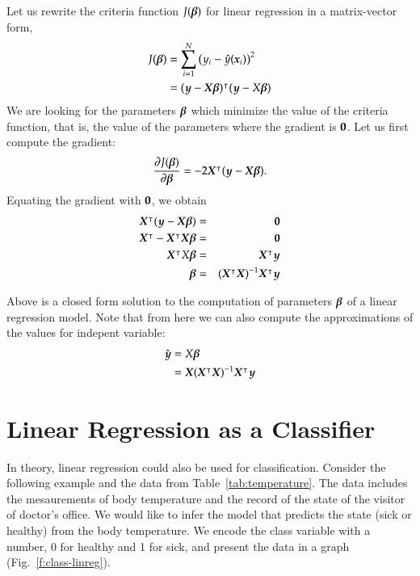 \begin{refsection}
Let us rewrite the criteria function $J(\boldsymbol{\beta})$ for linear regression in a matrix-vector form,
\begin{align}
J(\boldsymbol{\beta}) & = \sum_{i=1}^N\left(y_i-\hat{y}(\boldsymbol{x}_i)\right)^2 \\
& = (\boldsymbol{y}-\boldsymbol{X}\boldsymbol{\beta})^\intercal (\boldsymbol{y}-X\boldsymbol{\beta})
\end{align}
We are looking for the parameters $\boldsymbol{\beta}$ which minimize the value of the criteria function, that is, the value of the parameters where the gradient is $\boldsymbol{0}$. Let us first compute the gradient:
\begin{equation}
{\partial J(\boldsymbol{\beta}) \over\partial\boldsymbol{\beta}} = -2 \boldsymbol{X}^\intercal(\boldsymbol{y}-\boldsymbol{X}\boldsymbol{\beta}).
\end{equation}
Equating the gradient with $\boldsymbol{0}$, we obtain
\begin{eqnarray}
\boldsymbol{X}^\intercal(\boldsymbol{y}-\boldsymbol{X}\boldsymbol{\beta}) & = & \boldsymbol{0} \\
\boldsymbol{X}^\intercal-\boldsymbol{X}^\intercal\boldsymbol{X}\boldsymbol{\beta} & = & \boldsymbol{0} \\
\boldsymbol{X}^\intercal X\boldsymbol{\beta} & = & \boldsymbol{X}^\intercal \boldsymbol{y} \\
\boldsymbol{\beta} & = & (\boldsymbol{X}^\intercal \boldsymbol{X})^{-1}\boldsymbol{X}^\intercal \boldsymbol{y}
\end{eqnarray}

Above is a closed form solution to the computation of parameters $\boldsymbol{\beta}$ of a linear regression model. Note that from here we can also compute the approximations of the values for  indepent variable:
\begin{align}
\hat{\boldsymbol{y}} & = X\boldsymbol{\beta} \\
& = \boldsymbol{X} (\boldsymbol{X}^\intercal \boldsymbol{X})^{-1}\boldsymbol{X}^\intercal \boldsymbol{y}
\end{align}

\section{Linear Regression as a Classifier}

In theory, linear regression could also be used for classification. Consider the following example and the data from Table~\ref{tab:temperature}. The data includes the mesaurements of body temperature and the record of the state of the visitor of doctor's office. We would like to infer the model that predicts the state (sick or healthy) from the body temperature. We encode the class variable with a number, 0 for healthy and 1 for sick, and present the data in a graph (Fig.~\ref{f:class-linreg}).


\end{refsection}
